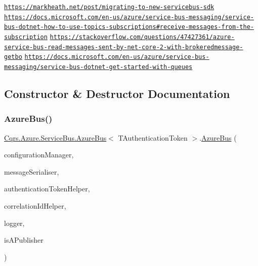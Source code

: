 \href{https://markheath.net/post/migrating-to-new-servicebus-sdk}{\tt https\+://markheath.\+net/post/migrating-\/to-\/new-\/servicebus-\/sdk} \href{https://docs.microsoft.com/en-us/azure/service-bus-messaging/service-bus-dotnet-how-to-use-topics-subscriptions#receive-messages-from-the-subscription}{\tt https\+://docs.\+microsoft.\+com/en-\/us/azure/service-\/bus-\/messaging/service-\/bus-\/dotnet-\/how-\/to-\/use-\/topics-\/subscriptions\#receive-\/messages-\/from-\/the-\/subscription} \href{https://stackoverflow.com/questions/47427361/azure-service-bus-read-messages-sent-by-net-core-2-with-brokeredmessage-getbo}{\tt https\+://stackoverflow.\+com/questions/47427361/azure-\/service-\/bus-\/read-\/messages-\/sent-\/by-\/net-\/core-\/2-\/with-\/brokeredmessage-\/getbo} \href{https://docs.microsoft.com/en-us/azure/service-bus-messaging/service-bus-dotnet-get-started-with-queues}{\tt https\+://docs.\+microsoft.\+com/en-\/us/azure/service-\/bus-\/messaging/service-\/bus-\/dotnet-\/get-\/started-\/with-\/queues} 

\subsection{Constructor \& Destructor Documentation}
\mbox{\label{classCqrs_1_1Azure_1_1ServiceBus_1_1AzureBus_a1046ff74282fd178f43e28420433d2a9_a1046ff74282fd178f43e28420433d2a9}} 
\subsubsection{\texorpdfstring{Azure\+Bus()}{AzureBus()}}
{\footnotesize\ttfamily \hyperlink{classCqrs_1_1Azure_1_1ServiceBus_1_1AzureBus}{Cqrs.\+Azure.\+Service\+Bus.\+Azure\+Bus}$<$ T\+Authentication\+Token $>$.\hyperlink{classCqrs_1_1Azure_1_1ServiceBus_1_1AzureBus}{Azure\+Bus} (\begin{DoxyParamCaption}\item[{\hyperlink{interfaceCqrs_1_1Configuration_1_1IConfigurationManager}{I\+Configuration\+Manager}}]{configuration\+Manager,  }\item[{\hyperlink{interfaceCqrs_1_1Azure_1_1ServiceBus_1_1IMessageSerialiser}{I\+Message\+Serialiser}$<$ T\+Authentication\+Token $>$}]{message\+Serialiser,  }\item[{\hyperlink{interfaceCqrs_1_1Authentication_1_1IAuthenticationTokenHelper}{I\+Authentication\+Token\+Helper}$<$ T\+Authentication\+Token $>$}]{authentication\+Token\+Helper,  }\item[{I\+Correlation\+Id\+Helper}]{correlation\+Id\+Helper,  }\item[{I\+Logger}]{logger,  }\item[{bool}]{is\+A\+Publisher }\end{DoxyParamCaption})\hspace{0.3cm}{\ttfamily [protected]}}



